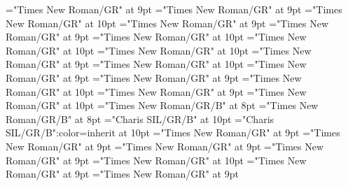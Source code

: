 \documentclass[gps1,twoside]{article}
\begin{document}
\font\semanticdomainsemanticdomainsemanticdomainssensesensessensesensesentrybeforespansensespanspandiventryletData="Times New Roman/GR" at 9pt
\font\picturesentryafterdiventryletData="Times New Roman/GR" at 9pt
\font\picturepicturessubentrysubentriesentryspandiventryletData="Times New Roman/GR" at 10pt
\font\picturepicturessubentrysubentriesentrypicturepicturessubentrysubentriesentryspandiventryletData="Times New Roman/GR" at 9pt
\font\picturepicturessubentrysubentriesentryafterpicturepicturessubentrysubentriesentryspandiventryletData="Times New Roman/GR" at 9pt
\font\sensenumberpicturepicturessubentrysubentriesentryspandiventryletData="Times New Roman/GR" at 10pt
\font\spanensensenumberpicturepicturessubentrysubentriesentryspandiventryletData="Times New Roman/GR" at 10pt
\font\captionpicturepicturessubentrysubentriesentryspandiventryletData="Times New Roman/GR" at 10pt
\font\spancaptionpicturepicturessubentrysubentriesentryspandiventryletData="Times New Roman/GR" at 9pt
\font\spanenspancaptionpicturepicturessubentrysubentriesentryspandiventryletData="Times New Roman/GR" at 10pt
\font\scientificnamesensespanspandiventryletData="Times New Roman/GR" at 9pt
\font\scientificnamesensesensesentryaftersensespanspandiventryletData="Times New Roman/GR" at 9pt
\font\spanenscientificnamesensespanspandiventryletData="Times New Roman/GR" at 10pt
\font\subentriesdiventryletData="Times New Roman/GR" at 9pt
\font\subentrysubentriesentrysubentriesdiventryletData="Times New Roman/GR" at 10pt
\font\headwordsubentrysubentriesentrysubentriesdiventryletData="Times New Roman/GR/B" at 8pt
\font\headwordaftersubentrysubentriesentrysubentriesdiventryletData="Times New Roman/GR/B" at 8pt
\font\spanbzhheadwordsubentrysubentriesentrysubentriesdiventryletData="Charis SIL/GR/B" at 10pt
\font\aspanbzhheadwordsubentrysubentriesentrysubentriesdiventryletData="Charis SIL/GR/B":color=inherit at 10pt
\font\spansubentrysubentriesentrysubentriesdiventryletData="Times New Roman/GR" at 9pt
\font\complexformtypessubentrysubentriesentryaftersubentrysubentriesentrysubentriesdiventryletData="Times New Roman/GR" at 9pt
\font\complexformtypespansubentrysubentriesentrysubentriesdiventryletData="Times New Roman/GR" at 9pt
\font\spancomplexformtypespansubentrysubentriesentrysubentriesdiventryletData="Times New Roman/GR" at 9pt
\font\spanenspancomplexformtypespansubentrysubentriesentrysubentriesdiventryletData="Times New Roman/GR" at 10pt
\font\pronunciationssubentrysubentriesentryaftersubentrysubentriesentrysubentriesdiventryletData="Times New Roman/GR" at 9pt
\font\pronunciationspansubentrysubentriesentrysubentriesdiventryletData="Times New Roman/GR" at 9pt
\end{document}
